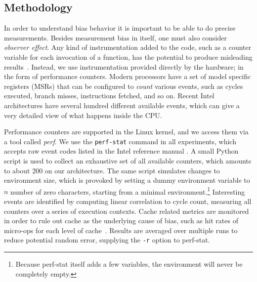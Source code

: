 \documentclass[a4paper,10pt,twocolumn,twoside]{article}
\begin{document}
\subsection{Methodology}

In order to understand bias behavior it is important to be able to do precise measurements.
Besides measurement bias in itself, one must also consider \emph{observer effect}.
Any kind of instrumentation added to the code, such as a counter variable for each invocation of a function, has the potential to produce misleading results~\cite{Mytkowicz:2008:OE&MB}.
Instead, we use instrumentation provided directly by the hardware; in the form of performance counters. 
Modern processors have a set of model specific registers (MSRs) that can be configured to \emph{count} various events, such as cycles executed, branch misses, instructions fetched, and so on.
Recent Intel architectures have several hundred different available events, which can give a very detailed view of what happens inside the CPU.

Performance counters are supported in the Linux kernel, and we access them via a tool called \emph{perf}. 
We use the \texttt{perf-stat} command in all experiments, which accepts raw event codes listed in the Intel reference manual \cite{Intel:2013:Volume3B}.
A small Python script is used to collect an exhaustive set of all available counters, which amounts to about 200 on our architecture.
The same script simulates changes to environment size, which is provoked by setting a dummy environment variable to $n$ number of zero characters, starting from a minimal environment.\footnote{Because perf-stat itself adds a few variables, the environment will never be completely empty.}
Interesting events are identified by computing linear correlation to cycle count, measuring all counters over a series of execution contexts.
Cache related metrics are monitored in order to rule out cache as the underlying cause of bias, such as hit rates of micro-ops for each level of cache~\cite{Intel:2012:OptimizationManual}.
Results are averaged over multiple runs to reduce potential random error, supplying the \texttt{-r} option to perf-stat. %
\end{document}

